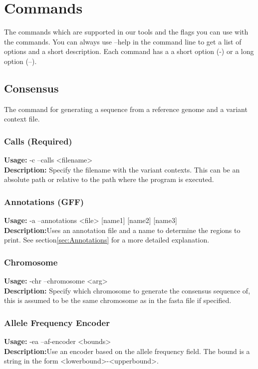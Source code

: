 \section{Commands}
The commands which are supported in our tools and the flags you can use with the commands. You can always use --help in the command line to get a list of options and a short description. Each command has a a short option (-) or a long option (--).

\subsection{Consensus} \label{command:consensus}
The command for generating a sequence from a reference genome and a variant context file.
\subsubsection{Calls (Required)}
\textbf{Usage:} -c --calls <filename>\\
\textbf{Description:} Specify the filename with the variant contexts. This can be an absolute path or relative to the path where the program is executed.

\subsubsection{Annotations (GFF)}
\textbf{Usage:} -a --annotations <file> [name1] [name2] [name3]\\
\textbf{Description:}Uses an annotation file and a name to determine the regions to print. See section\ref{sec:Annotations} for a more detailed explanation.

\subsubsection{Chromosome}
\textbf{Usage:} -chr --chromosome <arg>\\
\textbf{Description:} Specify which chromosome to generate the consensus sequence of, this is assumed to be the same chromosome as in the fasta file if specified. 

\subsubsection{Allele Frequency Encoder}
\textbf{Usage:} -ea --af-encoder <bounds>\\
\textbf{Description:}Use an encoder based on the allele frequency field. The bound is a string in the form <lowerbound>-<upperbound>.

